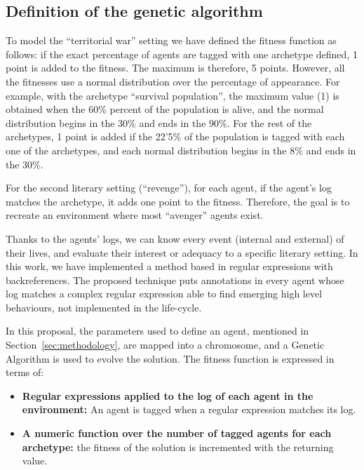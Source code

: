\documentclass{sig-alternate}
\begin{document}
\subsection{Definition of  the genetic algorithm}


To model the ``territorial war'' setting we have defined the fitness function as follows: if the exact percentage of agents are tagged with one archetype defined, 1 point is added to the fitness. The maximum is therefore, 5 points. However, all the fitnesses use a normal distribution over the percentage of appearance. For example, with the archetype ``survival population'', the maximum value (1) is obtained when the 60\% percent of the population is alive, and the normal distribution begins in the 30\% and ends in the 90\%. For the rest of the archetypes, 1 point is added if the 22'5\% of the population is tagged with each one of the archetypes, and each normal distribution begins in the 8\% and ends in the 30\%.

For the second literary setting (``revenge''), for each agent, if the agent's log matches the archetype, it adds one point to the fitness. Therefore, the goal is to recreate an environment where most ``avenger'' agents exist.

Thanks to the agents' logs, we can know every event (internal and
external) of their lives, and evaluate their interest or
adequacy to a specific literary setting.
In this work, we have implemented a method based in regular expressions with backreferences. The proposed technique puts annotations in every agent whose log matches a complex regular expression able to find emerging high level behaviours, not implemented in the life-cycle.

In this proposal, the parameters used to define an agent, mentioned in Section~\ref{sec:methodology}, are mapped into a chromosome, and a Genetic Algorithm is used to evolve the solution. The fitness function is expressed in terms of:

\begin{itemize}
\item \textbf{Regular expressions applied to the log of each agent in the environment:} An agent is tagged when a regular expression matches its log.
\item \textbf{A numeric function over the number of tagged agents for each archetype:} the fitness of the solution is incremented with the returning value.
\end{itemize}
\end{document}
